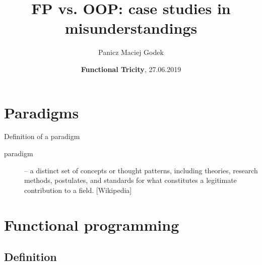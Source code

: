 \documentclass{beamer}
\title{\textbf{FP vs. OOP: case studies in misunderstandings}}
\author{Panicz Maciej Godek}
\institute{
  \tiny{\href{mailto:godek.maciek@gmail.com}{\textbf{godek.maciek@gmail.com}}}
}
\date{\textbf{Functional Tricity}, 27.06.2019}
\begin{document}
\begin{frame}
  \titlepage
\end{frame}

\section{Paradigms}

\begin{frame}{Definition of a paradigm}
  \begin{description}
  \item [paradigm] -- a distinct set of concepts or thought
    patterns, including theories, research methods, postulates,
    and standards for what constitutes a legitimate contribution
    to a field. [Wikipedia]
  \end{description}
\end{frame}

{ %
  \begin{frame}[plain]
  \end{frame}
}


\section{Functional programming}

\subsection{Definition}
\end{document}
